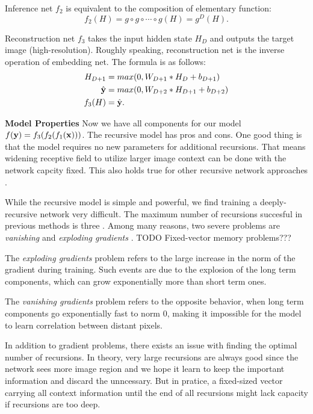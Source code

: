 \documentclass[10pt,twocolumn,letterpaper]{article}
\begin{document}
Inference net $f_2$ is equivalent to the composition of elementary function: 
\begin{equation}
f_2(H) = g \circ g \circ \cdots \circ g(H) =  g^{D}(H).
\end{equation}

Reconstruction net $f_3$ takes the input hidden state $H_D$ and outputs the target image (high-resolution). Roughly speaking, reconstruction net is the inverse operation of embedding net. The formula is as follows:
\begin{align}
	H_{D+1} &= max(0, W_{D+1}*H_D + b_{D+1})\\
	\hat{{\bf y}} &= max(0, W_{D+2}*H_{D+1} + b_{D+2})\\
	f_3(H) &= \hat{{\bf y}}.
\end{align}

\textbf{Model Properties} Now we have all components for our model $f({\bf y}) = f_3(f_2 (f_1({\bf x})))$. The recursive model has pros and cons. One good thing is that the model requires no new parameters for additional recursions. That means widening receptive field to utilize larger image context can be done with the network capcity fixed. This also holds true for other recursive network approaches \cite{Liang_2015_CVPR}.  

While the recursive model is simple and powerful, we find training a deeply-recursive network very difficult. The maximum number of recursions succesful in previous methods is three \cite{Liang_2015_CVPR}.  Among many reasons, two severe problems are \textit{vanishing} and \textit{exploding gradients} \cite{bengio1994learning, pascanu2013difficulty}.   TODO Fixed-vector memory problems???

The \textit{exploding gradients} problem refers to the large increase in the norm
of the gradient during training. Such events are due to
the explosion of the long term components, which can grow exponentially more than short term ones.  


The
\textit{vanishing gradients} problem refers to the opposite behavior,
when long term components go exponentially
fast to norm 0, making it impossible for the model to
learn correlation between distant pixels.

In addition to gradient problems, there exists an issue with finding the optimal number of recursions. In theory, very large recursions are always good since the network sees more image region and we hope it learn to keep the important information and discard the unncessary.  But in pratice, a fixed-sized vector carrying all context information until the end of all recursions might lack capacity if recursions are too deep. 
\end{document}
